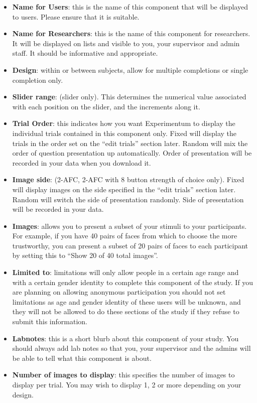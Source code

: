 \documentclass[]{book}
\begin{document}
\begin{itemize}
\item
  \textbf{Name for Users}: this is the name of this component that will
  be displayed to users. Please ensure that it is suitable.
\item
  \textbf{Name for Researchers}: this is the name of this component for
  researchers. It will be displayed on lists and visible to you, your
  supervisor and admin staff. It should be informative and appropriate.
\item
  \textbf{Design}: within or between subjects, allow for multiple
  completions or single completion only.
\item
  \textbf{Slider range}: (slider only). This determines the numerical
  value associated with each position on the slider, and the increments
  along it.
\item
  \textbf{Trial Order}: this indicates how you want Experimentum to
  display the individual trials contained in this component only. Fixed
  will display the trials in the order set on the ``edit trials''
  section later. Random will mix the order of question presentation up
  automatically. Order of presentation will be recorded in your data
  when you download it.
\item
  \textbf{Image side}: (2-AFC, 2-AFC with 8 button strength of choice
  only). Fixed will display images on the side specified in the ``edit
  trials'' section later. Random will switch the side of presentation
  randomly. Side of presentation will be recorded in your data.
\item
  \textbf{Images}: allows you to present a subset of your stimuli to
  your participants. For example, if you have 40 pairs of faces from
  which to choose the more trustworthy, you can present a subset of 20
  pairs of faces to each participant by setting this to ``Show 20 of 40
  total images''.
\item
  \textbf{Limited to}: limitations will only allow people in a certain
  age range and with a certain gender identity to complete this
  component of the study. If you are planning on allowing anonymous
  participation you should not set limitations as age and gender
  identity of these users will be unknown, and they will not be allowed
  to do these sections of the study if they refuse to submit this
  information.
\item
  \textbf{Labnotes}: this is a short blurb about this component of your
  study. You should always add lab notes so that you, your supervisor
  and the admins will be able to tell what this component is about.
\item
  \textbf{Number of images to display}: this specifies the number of
  images to display per trial. You may wish to display 1, 2 or more
  depending on your design.
\end{itemize}
\end{document}
